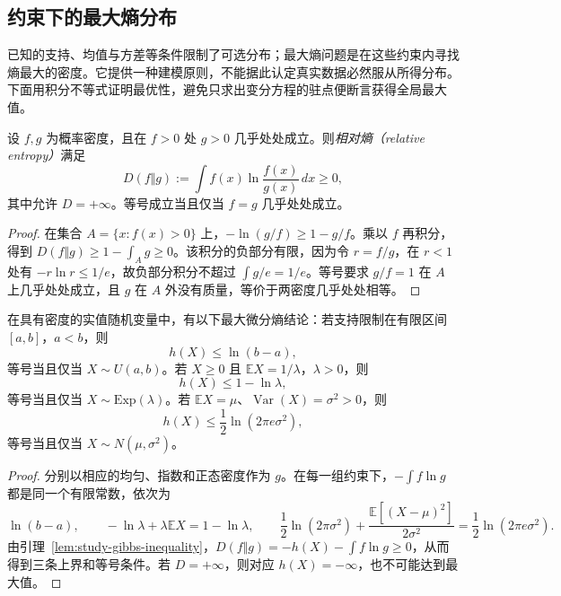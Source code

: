 \subsection{约束下的最大熵分布}
\label{subsec:study-maximum-entropy}

已知的支持、均值与方差等条件限制了可选分布；最大熵问题是在这些约束内寻找熵最大的密度。它提供一种建模原则，不能据此认定真实数据必然服从所得分布。下面用积分不等式证明最优性，避免只求出变分方程的驻点便断言获得全局最大值。

\begin{lemma}
\label{lem:study-gibbs-inequality}
设 $f,g$ 为概率密度，且在 $f>0$ 处 $g>0$ 几乎处处成立。则\emph{相对熵（relative entropy）}满足
\begin{equation}
  D(f\Vert g):=\int f(x)\ln\frac{f(x)}{g(x)}\,dx\ge0,
  \label{eq:study-gibbs-inequality}
\end{equation}
其中允许 $D=+\infty$。等号成立当且仅当 $f=g$ 几乎处处成立。
\end{lemma}

\begin{proof}
在集合 $A=\{x:f(x)>0\}$ 上，$-\ln(g/f)\ge1-g/f$。乘以 $f$ 再积分，得到 $D(f\Vert g)\ge1-\int_Ag\ge0$。该积分的负部分有限，因为令 $r=f/g$，在 $r<1$ 处有 $-r\ln r\le1/e$，故负部分积分不超过 $\int g/e=1/e$。等号要求 $g/f=1$ 在 $A$ 上几乎处处成立，且 $g$ 在 $A$ 外没有质量，等价于两密度几乎处处相等。
\end{proof}

\begin{theorem}
\label{thm:study-maximum-entropy}
在具有密度的实值随机变量中，有以下最大微分熵结论：若支持限制在有限区间 $[a,b]$，$a<b$，则
\[
  h(X)\le\ln(b-a),
\]
等号当且仅当 $X\sim U(a,b)$。若 $X\ge0$ 且 $\mathbb E X=1/\lambda$，$\lambda>0$，则
\[
  h(X)\le1-\ln\lambda,
\]
等号当且仅当 $X\sim\mathrm{Exp}(\lambda)$。若 $\mathbb E X=\mu$、$\operatorname{Var}(X)=\sigma^2>0$，则
\begin{equation}
  h(X)\le\frac12\ln(2\pi e\sigma^2),
  \label{eq:study-normal-max-entropy}
\end{equation}
等号当且仅当 $X\sim N(\mu,\sigma^2)$。
\end{theorem}

\begin{proof}
分别以相应的均匀、指数和正态密度作为 $g$。在每一组约束下，$-\int f\ln g$ 都是同一个有限常数，依次为
\[
  \ln(b-a),\qquad -\ln\lambda+\lambda\mathbb E X=1-\ln\lambda,
  \qquad
  \frac12\ln(2\pi\sigma^2)+\frac{\mathbb E[(X-\mu)^2]}{2\sigma^2}
    =\frac12\ln(2\pi e\sigma^2).
\]
由引理~\ref{lem:study-gibbs-inequality}，$D(f\Vert g)=-h(X)-\int f\ln g\ge0$，从而得到三条上界和等号条件。若 $D=+\infty$，则对应 $h(X)=-\infty$，也不可能达到最大值。
\end{proof}


